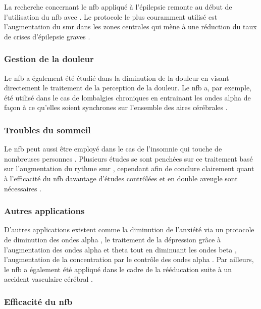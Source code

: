 La recherche concernant le \gls{nfb} appliqué à l'épilepsie remonte au début de l'utilisation du \gls{nfb} avec \citet{Sterman1974}. Le protocole le plus
couramment utilisé est l'augmentation du \gls{smr} dans les zones centrales qui mène à une réduction du taux de crises 
d'épilepsie graves \citep{Hughes2008, Walker2010, Tan2009, Sterman2010}.

\subsubsection{Gestion de la douleur}

Le \gls{nfb} a également été étudié dans la diminution de la douleur en visant directement le traitement de la perception de la douleur. Le \gls{nfb} a, par
exemple, été utilisé dans le cas de lombalgies chroniques en entrainant les ondes alpha de façon à ce qu'elles soient synchrones sur l'ensemble des aires 
cérébrales \citep{Mcknight2001, Thapa2018, Mayaud2019}.

\subsubsection{Troubles du sommeil}
Le \gls{nfb} peut aussi être employé dans le cas de l'insomnie qui touche de nombreuses personnes \citep{Marzbani2016}. Plusieurs études se sont penchées sur ce traitement
basé sur l'augmentation du rythme \gls{smr} \citep{Schabus2014, Schabus2017}, cependant afin de conclure clairement quant à l'efficacité du \gls{nfb} davantage 
d'études contrôlées et en double aveugle sont nécessaires \citep{Micoulaud2019sommeil}. 

\subsubsection{Autres applications}

D'autres applications existent comme la diminution de l'anxiété via un protocole de diminution des ondes alpha \citep{Budzynski2009}, le traitement de la dépression
grâce à l'augmentation des ondes alpha et theta tout en diminuant les ondes beta \citep{Hurt2014}, l'augmentation de la concentration par le contrôle des ondes
alpha \citep{Babiloni2008, Berka2010}. Par ailleurs, le \gls{nfb} a également été appliqué dans le cadre de la rééducation suite à un accident vasculaire cérébral \citep{Biasiucci2018,
Cervera2018}. 

\subsubsection{Efficacité du \gls{nfb}}
 
